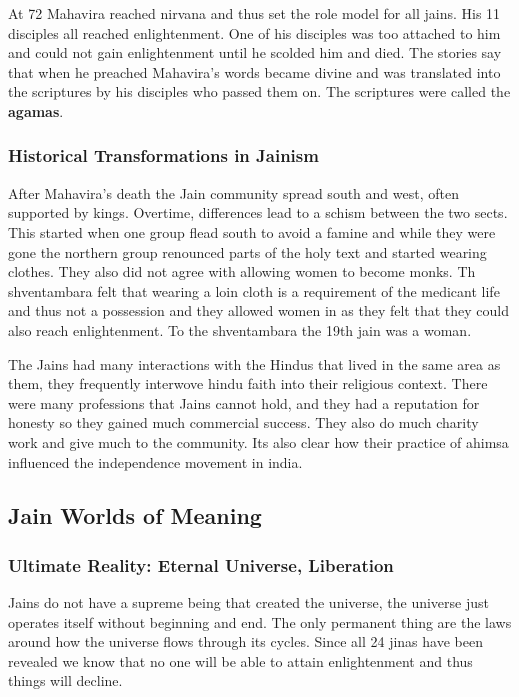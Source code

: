 \documentclass{article}
\begin{document}
At 72 Mahavira reached nirvana and thus set the role model for all jains. His 11 disciples all reached enlightenment. One of his disciples was too attached to him and could not gain enlightenment until he scolded him and died. The stories say that when he preached Mahavira's words became divine and was translated into the scriptures by his disciples who passed them on. The scriptures were called the \textbf{agamas}.

\subsubsection*{Historical Transformations in Jainism}
\label{ssub:historical_transformations_in_jainism}
After Mahavira's death the Jain community spread south and west, often supported by kings. Overtime, differences lead to a schism between the two sects. This started when one group flead south to avoid a famine and while they were gone the northern group renounced parts of the holy text and started wearing clothes. They also did not agree with allowing women to become monks. Th shventambara felt that wearing a loin cloth is a requirement of the medicant life and thus not a possession and they allowed women in as they felt that they could also reach enlightenment. To the shventambara the 19th jain was a woman.

The Jains had many interactions with the Hindus that lived in the same area as them, they frequently interwove hindu faith into their religious context. There were many professions that Jains cannot hold, and they had a reputation for honesty so they gained much commercial success. They also do much charity work and give much to the community. Its also clear how their practice of ahimsa influenced the independence movement in india.

\subsection*{Jain Worlds of Meaning}
\label{sub:jain_worlds_of_meaning}
\subsubsection*{Ultimate Reality: Eternal Universe, Liberation}
\label{ssub:ultimate_reality_eternal_universe_liberation}
Jains do not have a supreme being that created the universe, the universe just operates itself without beginning and end. The only permanent thing are the laws around how the universe flows through its cycles. Since all 24 jinas have been revealed we know that no one will be able to attain enlightenment and thus things will decline.
\end{document}
